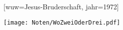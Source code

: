 [wuw={Jesus-Bruderschaft}, jahr=1972]

\beginverse
\endverse
\centering\texttt{[image: Noten/WoZweiOderDrei.pdf]}

\endsong
